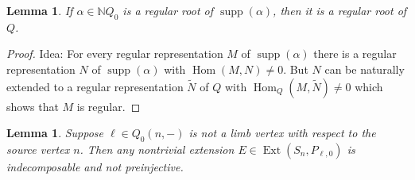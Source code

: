 \documentclass{amsart}
\newtheorem{lemma}[theorem]{Lemma}
\numberwithin{equation}{section}
\newcommand{\NN}{\mathbb{N}}
\newcommand{\Ext}{\operatorname{Ext}}
\newcommand{\Hom}{\operatorname{Hom}}
\newcommand{\supp}{\operatorname{supp}}
\begin{document}
\begin{lemma}\label{lem:regular support}
If $\alpha\in\NN Q_0$ is a regular root of $\supp(\alpha)$, then it is a regular root of $Q$.
\end{lemma}
\begin{proof}Idea: For every regular representation $M$ of $\supp(\alpha)$ there is a regular representation $N$ of $\supp(\alpha)$ with $\Hom(M,N)\neq 0$. But $N$ can be naturally extended to a regular representation $\tilde N$ of $Q$ with $\Hom_Q(M,\tilde N)\neq 0$ which shows that $M$ is regular.
\end{proof}

\begin{lemma}
  \label{le:nonlimb extensions}
  Suppose $\ell\in Q_0(n,-)$ is not a limb vertex with respect to the source vertex $n$.
  Then any nontrivial extension $E\in\Ext(S_n,P_{\ell,0})$ is indecomposable and not preinjective.
\end{lemma}
\end{document}
